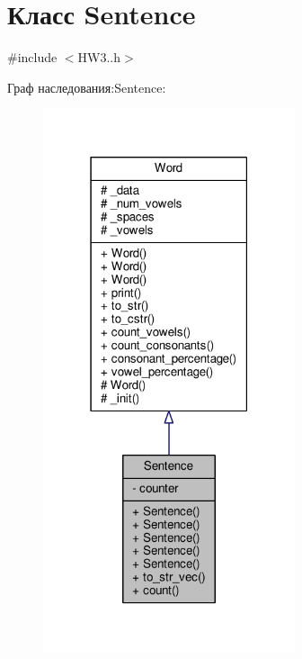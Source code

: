 \hypertarget{classSentence}{}\section{Класс Sentence}
\label{classSentence}


{\ttfamily \#include $<$H\+W3..\+h$>$}



Граф наследования\+:Sentence\+:\nopagebreak
\begin{figure}[H]
\begin{center}
\leavevmode
\includegraphics[width=210pt]{classSentence__inherit__graph}
\end{center}
\end{figure}


